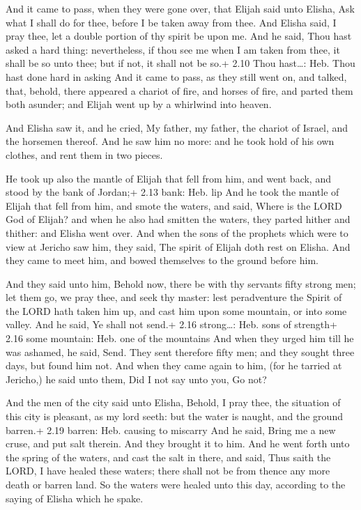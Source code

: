  And it came to pass, when they were gone over, that
Elijah said unto Elisha, Ask what I shall do for thee, before I be taken
away from thee. And Elisha said, I pray thee, let a double portion of
thy spirit be upon me.  And he said, Thou hast asked a hard
thing: nevertheless, if thou see me when I am taken from thee, it shall
be so unto thee; but if not, it shall not be so.+ 2.10 Thou hast\ldots:
Heb. Thou hast done hard in asking  And it came to pass, as
they still went on, and talked, that, behold, there appeared a chariot
of fire, and horses of fire, and parted them both asunder; and Elijah
went up by a whirlwind into heaven.

 And Elisha saw it, and he cried, My father, my father,
the chariot of Israel, and the horsemen thereof. And he saw him no more:
and he took hold of his own clothes, and rent them in two pieces.

 He took up also the mantle of Elijah that fell from him,
and went back, and stood by the bank of Jordan;+ 2.13 bank: Heb. lip
 And he took the mantle of Elijah that fell from him, and
smote the waters, and said, Where is the LORD God of Elijah? and when he
also had smitten the waters, they parted hither and thither: and Elisha
went over.  And when the sons of the prophets which were to
view at Jericho saw him, they said, The spirit of Elijah doth rest on
Elisha. And they came to meet him, and bowed themselves to the ground
before him.

 And they said unto him, Behold now, there be with thy
servants fifty strong men; let them go, we pray thee, and seek thy
master: lest peradventure the Spirit of the LORD hath taken him up, and
cast him upon some mountain, or into some valley. And he said, Ye shall
not send.+ 2.16 strong\ldots: Heb. sons of strength+ 2.16 some mountain:
Heb. one of the mountains  And when they urged him till he
was ashamed, he said, Send. They sent therefore fifty men; and they
sought three days, but found him not.  And when they came
again to him, (for he tarried at Jericho,) he said unto them, Did I not
say unto you, Go not?

 And the men of the city said unto Elisha, Behold, I pray
thee, the situation of this city is pleasant, as my lord seeth: but the
water is naught, and the ground barren.+ 2.19 barren: Heb. causing to
miscarry  And he said, Bring me a new cruse, and put salt
therein. And they brought it to him.  And he went forth
unto the spring of the waters, and cast the salt in there, and said,
Thus saith the LORD, I have healed these waters; there shall not be from
thence any more death or barren land.  So the waters were
healed unto this day, according to the saying of Elisha which he spake.

